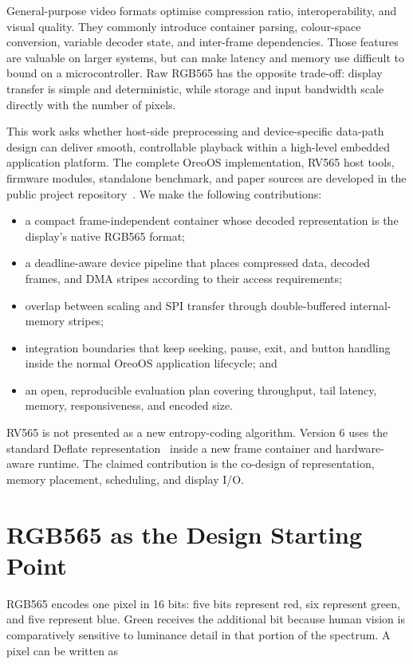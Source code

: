 \documentclass[11pt,twocolumn]{article}
\newcommand{\system}{RV565}
\begin{document}
General-purpose video formats optimise compression ratio, interoperability,
and visual quality.  They commonly introduce container parsing, colour-space
conversion, variable decoder state, and inter-frame dependencies.  Those
features are valuable on larger systems, but can make latency and memory use
difficult to bound on a microcontroller.  Raw RGB565 has the opposite
trade-off: display transfer is simple and deterministic, while storage and
input bandwidth scale directly with the number of pixels.

This work asks whether host-side preprocessing and device-specific data-path
design can deliver smooth, controllable playback within a high-level embedded
application platform.  The complete OreoOS implementation, RV565 host tools,
firmware modules, standalone benchmark, and paper sources are developed in the
public project repository~\cite{bhattacharya2026oreo}.  We make the following
contributions:

\begin{itemize}
  \item a compact frame-independent container whose decoded representation is
        the display's native RGB565 format;
  \item a deadline-aware device pipeline that places compressed data, decoded
        frames, and DMA stripes according to their access requirements;
  \item overlap between scaling and SPI transfer through double-buffered
        internal-memory stripes;
  \item integration boundaries that keep seeking, pause, exit, and button
        handling inside the normal OreoOS application lifecycle; and
  \item an open, reproducible evaluation plan covering throughput, tail
        latency, memory, responsiveness, and encoded size.
\end{itemize}

\system{} is not presented as a new entropy-coding algorithm.  Version 6 uses
the standard Deflate representation~\cite{deutsch1996deflate} inside a new
frame container and hardware-aware runtime.  The claimed contribution is the
co-design of representation, memory placement, scheduling, and display I/O.

\section{RGB565 as the Design Starting Point}

RGB565 encodes one pixel in 16 bits: five bits represent red, six represent
green, and five represent blue.  Green receives the additional bit because
human vision is comparatively sensitive to luminance detail in that portion
of the spectrum.  A pixel can be written as
\end{document}
